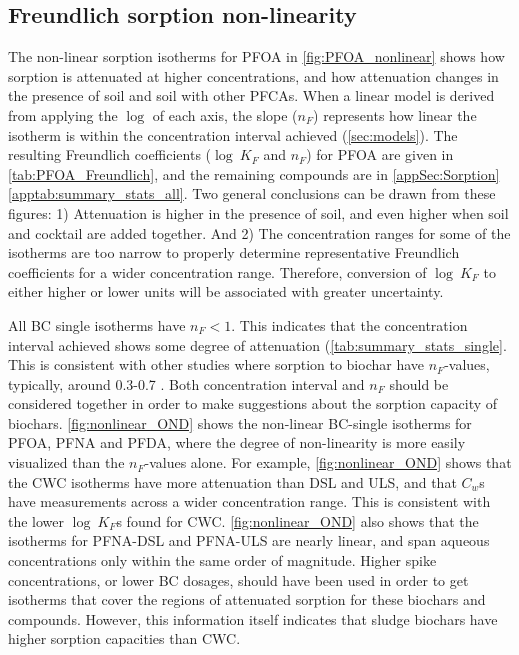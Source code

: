 \subsection{Freundlich sorption non-linearity}\label{sec:non-linearity}
The non-linear sorption isotherms for PFOA in \cref{fig:PFOA_nonlinear} shows how sorption is attenuated at higher concentrations, and how attenuation changes in the presence of soil and soil with other PFCAs. When a linear model is derived from applying the $\log$ of each axis, the slope ($n_F$) represents how linear the isotherm is within the concentration interval achieved (\cref{sec:models}). The resulting Freundlich coefficients ($\log~K_F$ and $n_F$) for PFOA are given in \cref{tab:PFOA_Freundlich}, and the remaining compounds are in \cref{appSec:Sorption}\cref{apptab:summary_stats_all}. Two general conclusions can be drawn from these figures: 1) Attenuation is higher in the presence of soil, and even higher when soil and cocktail are added together. And 2) The concentration ranges for some of the isotherms are too narrow to properly determine representative Freundlich coefficients for a wider concentration range. Therefore, conversion of $\log~K_F$ to either higher or lower units will be associated with greater uncertainty. 

All BC single isotherms have $n_F<1$. This indicates that the concentration interval achieved shows some degree of attenuation (\cref{tab:summary_stats_single}. This is consistent with other studies where sorption to biochar have $n_F$-values, typically, around 0.3-0.7 \citep{Cornelissen2005}. Both concentration interval and $n_F$ should be considered together in order to make suggestions about the sorption capacity of biochars. \cref{fig:nonlinear_OND} shows the non-linear BC-single isotherms for PFOA, PFNA and PFDA, where the degree of non-linearity is more easily visualized than the $n_F$-values alone. For example, \cref{fig:nonlinear_OND} shows that the CWC isotherms have more attenuation than DSL and ULS, and that $C_w$s have measurements across a wider concentration range. This is consistent with the lower $\log~K_F$s found for CWC. \cref{fig:nonlinear_OND} also shows that the isotherms for PFNA-DSL and PFNA-ULS are nearly linear, and span aqueous concentrations only within the same order of magnitude. Higher spike concentrations, or lower BC dosages, should have been used in order to get isotherms that cover the regions of attenuated sorption for these biochars and compounds. However, this information itself indicates that sludge biochars have higher sorption capacities than CWC.  

